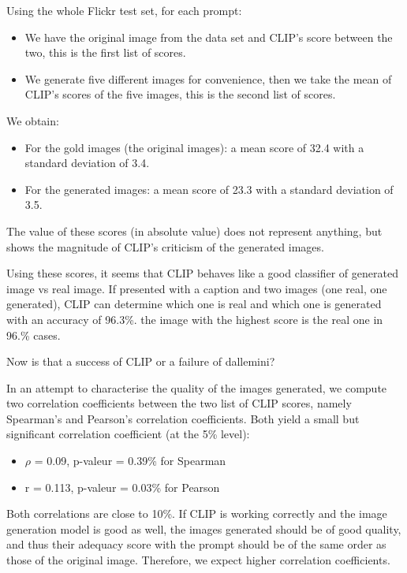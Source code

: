 \documentclass{article}
\begin{document}
\begin{multicols}{2}
Using the whole Flickr test set, for each prompt: 
\begin{itemize}
    \item We have the original image from the data set and CLIP's score between the two, this is the first list of scores.
    \item We generate five different images for convenience, then we take the mean of CLIP's scores of the five images, this is the second list of scores.
\end{itemize}

We obtain:
\begin{itemize}
    \item For the gold images (the original images): a mean score of 32.4 with a standard deviation of 3.4.
    \item For the generated images: a mean score of 23.3 with a standard deviation of 3.5.
\end{itemize}

The value of these scores (in absolute value) does not represent anything, but shows the magnitude of CLIP's criticism of the generated images.

Using these scores, it seems that CLIP behaves like a good classifier of generated image vs real image. If presented with a caption and two images (one real, one generated), CLIP can determine which one is real and which one is generated with an accuracy of 96.3\%. the image with the highest score is the real one in 96.\% cases.

Now is that a success of CLIP or a failure of \gls{dallemini}?

In an attempt to characterise the quality of the images generated, we compute two correlation coefficients between the two list of CLIP scores, namely Spearman's and Pearson's correlation coefficients. Both yield a small but significant correlation coefficient (at the 5\% level):
\begin{itemize}
    \item $\rho$ = 0.09, p-valeur = 0.39\% for Spearman
    \item r = 0.113, p-valeur = 0.03\% for Pearson
\end{itemize}
Both correlations are close to 10\%. If CLIP is working correctly and the image generation model is good as well, the images generated should be of good quality, and thus their adequacy score with the prompt should be of the same order as those of the original image. Therefore, we expect higher correlation coefficients. 


\end{multicols}
\end{document}
